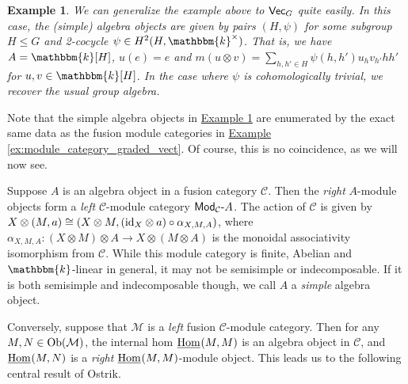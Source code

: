 \documentclass[12pt, reqno]{amsart}
\numberwithin{equation}{section}
\theoremstyle{plainspace}
\theoremstyle{definitionspace}
\newtheorem{example}[theorem]{Example}
\theoremstyle{remarkspace}
\newcommand{\id}{\textup{id}}
\newcommand{\mathcat}[1]{\mathcal{#1}}
\newcommand{\Ob}{\textup{Ob}}
\newcommand{\IntHom}[2][]{
	\ifthenelse{\equal{#2}{}}
		{\underline{\textup{Hom}}_{#1}}
		{\underline{\textup{Hom}}_{#1}\!\left(#2\right)}
}
\newcommand{\textcat}[1]{\textup{\textsf{#1}}}
\newcommand{\rmodcat}[2][]{\textcat{Mod}_{#1}\textcat{-}#2}
\begin{document}

\begin{example}\label{ex:algebra_object_graded_vect}
We can generalize the example above to $\textcat{Vec}_G$ quite easily. In this case, the (simple) algebra objects are given by pairs $(H, \psi)$ for some subgroup $H \leq G$ and 2-cocycle $\psi \in H^2(H, \mathbbm{k}^{\times})$. That is, we have $A = \mathbbm{k}[H]$, $u(e) = e$ and $m(u \otimes v) = \sum_{h, h' \in H}{\psi(h, h')u_h v_{h'} hh'}$ for $u, v \in \mathbbm{k}[H]$. In the case where $\psi$ is cohomologically trivial, we recover the usual group algebra.
\end{example}
\leavevmode

\noindent Note that the simple algebra objects in \hyperref[ex:algebra_object_graded_vect]{Example \ref*{ex:algebra_object_graded_vect}} are enumerated by the exact same data as the fusion module categories in \hyperref[ex:module_category_graded_vect]{Example \ref*{ex:module_category_graded_vect}}. Of course, this is no coincidence, as we will now see.
\newline

\noindent Suppose $A$ is an algebra object in a fusion category $\mathcat{C}$. Then the {\em right} $A$-module objects form a {\em left} $\mathcat{C}$-module category $\rmodcat[\mathcat{C}]{A}$. The action of $\mathcat{C}$ is given by $X \otimes (M, a) \cong (X \otimes M, (\id_X \otimes a) \circ \alpha_{X,M,A})$, where $\alpha_{X,M,A} : (X \otimes M) \otimes A \to X \otimes (M \otimes A)$ is the monoidal associativity isomorphism from $\mathcat{C}$. While this module category is finite, Abelian and $\mathbbm{k}$-linear in general, it may not be semisimple or indecomposable. If it is both semisimple and indecomposable though, we call $A$ a {\em simple} algebra object.
\newline

\noindent Conversely, suppose that $\mathcat{M}$ is a {\em left} fusion $\mathcat{C}$-module category. Then for any $M, N \in \Ob(\mathcat{M})$, the internal hom $\IntHom{M, M}$ is an algebra object in $\mathcat{C}$, and $\IntHom{M, N}$ is a {\em right} $\IntHom{M, M}$-module object. This leads us to the following central result of Ostrik.
\newline
\end{document}
